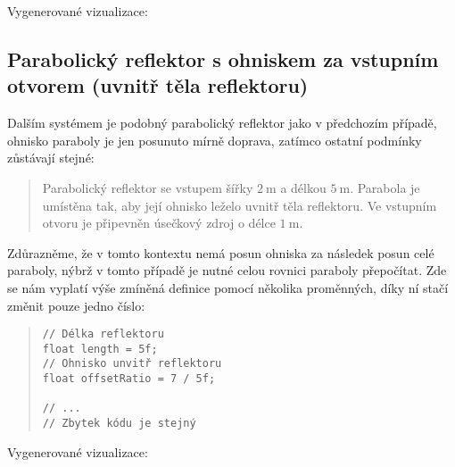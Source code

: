 Vygenerované vizualizace:




\subsection[Parabolický reflektor s ohniskem za vstupním otvorem]{Parabolický reflektor s ohniskem za vstupním otvorem (uvnitř těla reflektoru)}

Dalším systémem je podobný parabolický reflektor jako v předchozím případě, ohnisko paraboly je jen posunuto mírně doprava, zatímco ostatní podmínky zůstávají stejné:

\begin{quote}
    Parabolický reflektor se vstupem šířky $2\ \mathrm{m}$ a délkou $5\ \mathrm{m}$. Parabola je umístěna tak, aby její ohnisko leželo uvnitř těla reflektoru. Ve vstupním otvoru je připevněn úsečkový zdroj o délce $1\ \mathrm{m}$.
\end{quote}

Zdůrazněme, že v tomto kontextu nemá posun ohniska za následek posun celé paraboly, nýbrž v tomto případě je nutné celou rovnici paraboly přepočítat. Zde se nám vyplatí výše zmíněná definice pomocí několika proměnných, díky ní stačí změnit pouze jedno číslo:

\begin{minipage}{\textwidth}\begin{quote}\begin{lstlisting}
// Délka reflektoru
float length = 5f;
// Ohnisko unvitř reflektoru
float offsetRatio = 7 / 5f;

// ...
// Zbytek kódu je stejný
\end{lstlisting}\end{quote}\end{minipage}

Vygenerované vizualizace:




